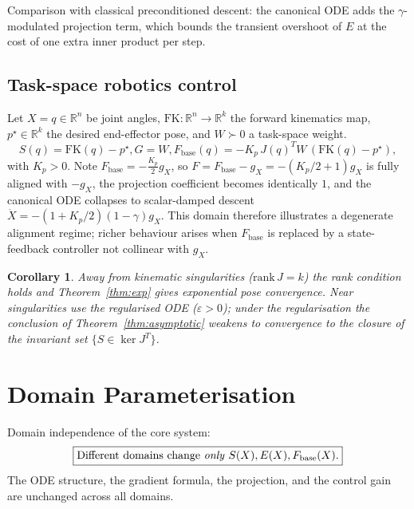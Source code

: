 \documentclass[11pt,oneside]{amsart}
\def\quad{ }%
\def\qquad{ }%
\def\textbf#1{#1}%
\theoremstyle{plain}
\newtheorem{corollary}[theorem]{Corollary}
\theoremstyle{definition}
\newcommand{\Xdot}{\dot{X}}
\newcommand{\gX}{g_X}
\newcommand{\Fbase}{F_{\mathrm{base}}}
\newcommand{\R}{\mathbb{R}}
\begin{document}
Comparison with classical preconditioned descent: the canonical ODE
adds the $\gamma$-modulated projection term, which bounds the
transient overshoot of $E$ at the cost of one extra inner product per
step.

\subsection{Task-space robotics control}
\label{sec:app-robotics}

Let $X = q \in \R^{n}$ be joint angles, $\mathrm{FK}: \R^{n}\to\R^{k}$
the forward kinematics map, $p^{\star}\in\R^{k}$ the desired end-effector
pose, and $W\succ 0$ a task-space weight.
\[
  S(q) = \mathrm{FK}(q) - p^{\star},\qquad
  G = W,\qquad
  \Fbase(q) = -K_{p}\,J(q)^{T}W\,(\mathrm{FK}(q) - p^{\star}),
\]
with $K_{p}>0$. Note $\Fbase = -\tfrac{K_{p}}{2}\gX$, so $F=\Fbase-\gX = -(K_{p}/2+1)\gX$
is fully aligned with $-\gX$, the projection coefficient becomes
identically $1$, and the canonical ODE collapses to scalar-damped
descent $\Xdot = -(1+K_{p}/2)(1-\gamma)\gX$. This domain therefore
illustrates a degenerate alignment regime; richer behaviour arises
when $\Fbase$ is replaced by a state-feedback controller not
collinear with $\gX$.

\begin{corollary}
Away from kinematic singularities ($\mathrm{rank}\,J = k$) the rank
condition holds and Theorem~\ref{thm:exp} gives exponential pose
convergence. Near singularities use the regularised ODE
($\varepsilon>0$); under the regularisation the conclusion of
Theorem~\ref{thm:asymptotic} weakens to convergence to the closure of
the invariant set $\{S\in\ker J^{T}\}$.
\end{corollary}

\section{Domain Parameterisation}
\label{sec:domain}

\begin{lockbox}
\textbf{Domain independence of the core system:}
\[
\boxed{
  \text{Different domains change \emph{only} }
  S(X),\quad E(X),\quad \Fbase(X).
}
\]
\textbf{The ODE structure, the gradient formula, the projection, and the
control gain are unchanged across all domains.}
\end{lockbox}
\end{document}
